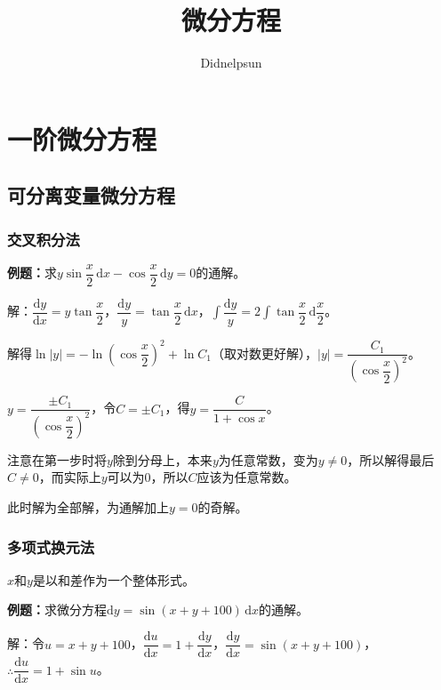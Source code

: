 \documentclass[UTF8, 12pt]{ctexart}
\author{Didnelpsun}
\title{微分方程}
\date{}
\begin{document}
\maketitle
\pagestyle{empty}
\thispagestyle{empty}
\tableofcontents
\thispagestyle{empty}
\newpage
\pagestyle{plain}
\setcounter{page}{1}

\section{一阶微分方程}

\subsection{可分离变量微分方程}

\subsubsection{交叉积分法}

\textbf{例题：}求$y\sin\dfrac{x}{2}\,\textrm{d}x-\cos\dfrac{x}{2}\,\textrm{d}y=0$的通解。

解：$\dfrac{\textrm{d}y}{\textrm{d}x}=y\tan\dfrac{x}{2}$，$\dfrac{\textrm{d}y}{y}=\tan\dfrac{x}{2}\,\textrm{d}x$，$\displaystyle{\int\dfrac{\textrm{d}y}{y}=2\int\tan\dfrac{x}{2}\,\textrm{d}\dfrac{x}{2}}$。

解得$\ln\vert y\vert=-\ln\left(\cos\dfrac{x}{2}\right)^2+\ln C_1$（取对数更好解），$\vert y\vert=\dfrac{C_1}{\left(\cos\dfrac{x}{2}\right)^2}$。

$y=\dfrac{\pm C_1}{\left(\cos\dfrac{x}{2}\right)^2}$，令$C=\pm C_1$，得$y=\dfrac{C}{1+\cos x}$。

注意在第一步时将$y$除到分母上，本来$y$为任意常数，变为$y\neq0$，所以解得最后$C\neq0$，而实际上$y$可以为0，所以$C$应该为任意常数。

此时解为全部解，为通解加上$y=0$的奇解。

\subsubsection{多项式换元法}

$x$和$y$是以和差作为一个整体形式。

\textbf{例题：}求微分方程$\textrm{d}y=\sin(x+y+100)\,\textrm{d}x$的通解。

解：令$u=x+y+100$，$\dfrac{\textrm{d}u}{\textrm{d}x}=1+\dfrac{\textrm{d}y}{\textrm{d}x}$，$\dfrac{\textrm{d}y}{\textrm{d}x}=\sin(x+y+100)$，$\therefore\dfrac{\textrm{d}u}{\textrm{d}x}=1+\sin u$。
\end{document}
